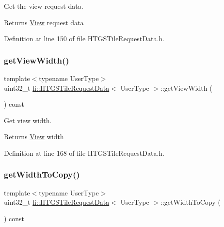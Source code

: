 Get the view request data. 

\begin{DoxyReturn}{Returns}
\hyperlink{classfi_1_1View}{View} request data 
\end{DoxyReturn}


Definition at line 150 of file H\+T\+G\+S\+Tile\+Request\+Data.\+h.

\mbox{\label{classfi_1_1HTGSTileRequestData_a7d0ff746dab75278e796decad9223cd4}} 
\subsubsection{\texorpdfstring{get\+View\+Width()}{getViewWidth()}}
{\footnotesize\ttfamily template$<$typename User\+Type$>$ \\
uint32\+\_\+t \hyperlink{classfi_1_1HTGSTileRequestData}{fi\+::\+H\+T\+G\+S\+Tile\+Request\+Data}$<$ User\+Type $>$\+::get\+View\+Width (\begin{DoxyParamCaption}{ }\end{DoxyParamCaption}) const\hspace{0.3cm}{\ttfamily [inline]}}



Get view width. 

\begin{DoxyReturn}{Returns}
\hyperlink{classfi_1_1View}{View} width 
\end{DoxyReturn}


Definition at line 168 of file H\+T\+G\+S\+Tile\+Request\+Data.\+h.

\mbox{\label{classfi_1_1HTGSTileRequestData_ae368851c9c926aa576828ffc020d3f03}} 
\subsubsection{\texorpdfstring{get\+Width\+To\+Copy()}{getWidthToCopy()}}
{\footnotesize\ttfamily template$<$typename User\+Type$>$ \\
uint32\+\_\+t \hyperlink{classfi_1_1HTGSTileRequestData}{fi\+::\+H\+T\+G\+S\+Tile\+Request\+Data}$<$ User\+Type $>$\+::get\+Width\+To\+Copy (\begin{DoxyParamCaption}{ }\end{DoxyParamCaption}) const\hspace{0.3cm}{\ttfamily [inline]}}



